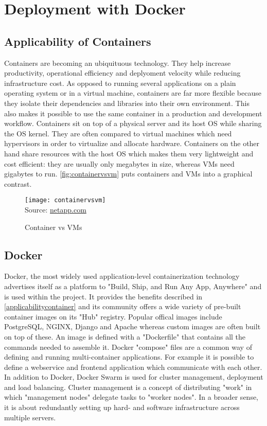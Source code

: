 \chapter[Deployment]{Deployment with Docker} \label{ch:deployment}

\section{Applicability of Containers} \label{applicabilitycontainer}
Containers are becoming an ubiquituous technology. They help increase productivity, operational efficiency and deplyoment velocity while reducing infrastructure cost. As opposed to running several applications on a plain operating system or in a virtual machine, containers are far more flexible because they isolate their dependencies and libraries into their own environment. This also makes it possible to use the same container in a production and development workflow. Containers sit on top of a physical server and its host OS while sharing the OS kernel. They are often compared to virtual machines which need hypervisors in order to virtualize and allocate hardware. Containers on the other hand share resources with the host OS which makes them very lightweight and cost efficient: they are usually only megabytes in size, whereas VMs need gigabytes to run. \autoref{fig:containervsvm} puts containers and VMs into a graphical contrast.

\begin{figure}[H]
    \begin{center}
    \texttt{[image: containervsvm]}
    \\
    Source: \href{https://blog.netapp.com/wp-content/uploads/2016/03/Screen-Shot-2018-03-20-at-9.24.09-AM-1024x548.png}{netapp.com}
    \end{center}
    \caption{Container vs VMs}
    \label{fig:containervsvm}
\end{figure}
  
\section{Docker}
Docker, the most widely used application-level containerization technology advertises itself as a platform to "Build, Ship, and Run Any App, Anywhere" and is used within the project. It provides the benefits described in \autoref{applicabilitycontainer} and its community offers a wide variety of pre-built container images on its "Hub" registry. Popular offical images include PostgreSQL, NGINX, Django and Apache whereas custom images are often built on top of these. An image is defined with a "Dockerfile" that contains all the commands needed to assemble it. Docker "compose" files are a common way of defining and running multi-container applications. For example it is possible to define a webservice and frontend application which communicate with each other. In addition to Docker, Docker Swarm is used for cluster management, deployment and load balancing. Cluster management is a concept of distributing "work" in which "management nodes" delegate tasks to "worker nodes". In a broader sense, it is about redundantly setting up hard- and software infrastructure across multiple servers.

